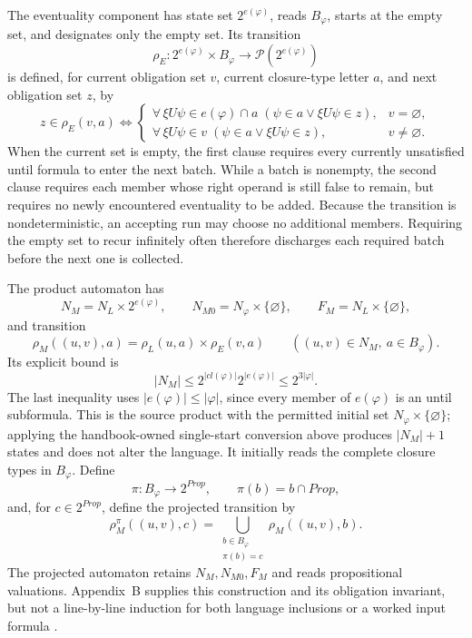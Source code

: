 The eventuality component has state set \(2^{e(\varphi)}\), reads
\(B_\varphi\), starts at the empty set, and designates only the empty set.
Its transition
\[
 \rho_E:2^{e(\varphi)}\times B_\varphi
 \longrightarrow\mathcal P(2^{e(\varphi)})
\]
is defined, for current obligation set \(v\), current closure-type letter
\(a\), and next obligation set \(z\), by
\[
 z\in\rho_E(v,a)
 \Longleftrightarrow
 \begin{cases}
  \forall\,\xi U\psi\in e(\varphi)\cap a\;
  (\psi\in a\lor \xi U\psi\in z),&v=\varnothing,\\
  \forall\,\xi U\psi\in v\;
  (\psi\in a\lor \xi U\psi\in z),&v\ne\varnothing.
 \end{cases}
\]
When the current set is empty, the first clause requires every currently
unsatisfied until formula to enter the next batch.  While a batch is nonempty,
the second clause requires each member whose right operand is still false to
remain, but requires no newly encountered eventuality to be added.  Because
the transition is nondeterministic, an accepting run may choose no additional
members.  Requiring the empty set to recur infinitely often therefore
discharges each required batch before the next one is collected.

The product automaton has
\[
 N_M=N_L\times2^{e(\varphi)},
 \qquad
 N_{M0}=N_\varphi\times\{\varnothing\},
 \qquad
 F_M=N_L\times\{\varnothing\},
\]
and transition
\[
 \rho_M((u,v),a)
 =\rho_L(u,a)\times\rho_E(v,a)
 \qquad
 ((u,v)\in N_M,\ a\in B_\varphi).
\]
Its explicit bound is
\[
 |N_M|
 \le2^{|cl(\varphi)|}2^{|e(\varphi)|}
 \le2^{3|\varphi|}.
\]
The last inequality uses \(|e(\varphi)|\le|\varphi|\), since every member of
\(e(\varphi)\) is an until subformula.  This is the source product with the
permitted initial set \(N_\varphi\times\{\varnothing\}\); applying the
handbook-owned single-start conversion above produces \(|N_M|+1\) states and
does not alter the language.
It initially reads the complete closure types in \(B_\varphi\).  Define
\[
 \pi:B_\varphi\longrightarrow2^{\mathit{Prop}},
 \qquad
 \pi(b)=b\cap\mathit{Prop},
\]
and, for \(c\in2^{\mathit{Prop}}\), define the projected transition by
\[
 \rho_M^\pi((u,v),c)
 =\bigcup_{\substack{b\in B_\varphi\\\pi(b)=c}}
   \rho_M((u,v),b).
\]
The projected automaton retains \(N_M,N_{M0},F_M\) and reads propositional
valuations.  Appendix~B supplies this construction and its obligation
invariant, but not a line-by-line induction for both language inclusions or a
worked input formula
\cite[app.~B, pp.~2--3]{VardiWolper1986}.

